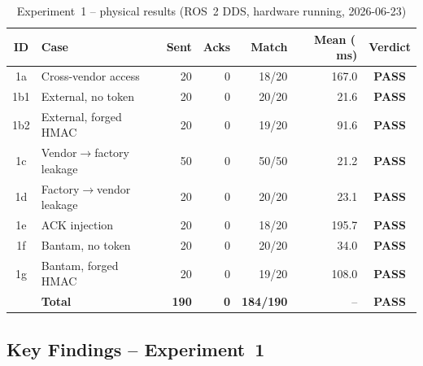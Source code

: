 \documentclass[11pt,a4paper]{article}
\newcommand{\pass}{\textcolor{passgreen}{\textbf{PASS}}}
\newcommand{\ms}{\,\si{ms}}
\begin{document}
\begin{table}[h]
\centering
\caption{Experiment~1 -- physical results (ROS~2 DDS, hardware running, 2026-06-23)}
\label{tab:exp1-physical}
\small
\setlength{\tabcolsep}{5pt}
\begin{tabular}{@{}c p{3.8cm} r r r r c@{}}
\toprule
\textbf{ID} & \textbf{Case} & \textbf{Sent} & \textbf{Acks} &
\textbf{Match} & \textbf{Mean (\ms)} & \textbf{Verdict} \\
\midrule
1a  & Cross-vendor access        & 20 & 0 & 18/20 & 167.0 & \pass{} \\
1b1 & External, no token         & 20 & 0 & 20/20 &  21.6 & \pass{} \\
1b2 & External, forged HMAC      & 20 & 0 & 19/20 &  91.6 & \pass{} \\
1c  & Vendor$\to$factory leakage & 50 & 0 & 50/50 &  21.2 & \pass{} \\
1d  & Factory$\to$vendor leakage & 20 & 0 & 20/20 &  23.1 & \pass{} \\
1e  & ACK injection              & 20 & 0 & 18/20 & 195.7 & \pass{} \\
1f  & Bantam, no token           & 20 & 0 & 20/20 &  34.0 & \pass{} \\
1g  & Bantam, forged HMAC        & 20 & 0 & 19/20 & 108.0 & \pass{} \\
\midrule
    & \textbf{Total}             & \textbf{190} & \textbf{0} & \textbf{184/190} & -- & \pass{} \\
\bottomrule
\end{tabular}
\end{table}

\subsection{Key Findings -- Experiment~1}
\end{document}
